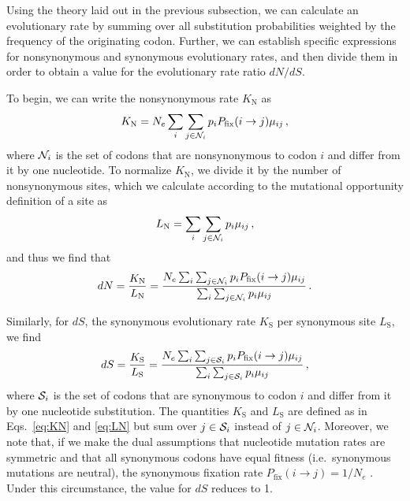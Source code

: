 \documentclass{pnastwo}
\begin{document}
\begin{article}
Using the theory laid out in the previous subsection, we can calculate an evolutionary rate by summing over all substitution probabilities weighted by the frequency of the originating codon. Further, we can establish specific expressions for nonsynonymous and synonymous evolutionary rates, and then divide them in order to obtain a value for the evolutionary rate ratio $dN/dS$.

To begin, we can write the nonsynonymous rate $K_\text{N}$ as 
\begin{equation}\label{eq:KN}
	K_\text{N} = N_e \sum_i \sum_{j \in {\cal N}_i} p_i P_\text{fix}(i \rightarrow j) \mu_{ij}\,,
\end{equation}
where ${\cal N}_i$ is the set of codons that are nonsynonymous to codon $i$ and differ from it by one nucleotide. To normalize $K_\text{N}$, we divide it by the number of nonsynonymous sites, which we calculate according to the mutational opportunity definition of a site \cite{GoldmanYang1994, Yang2006} as 
\begin{equation}\label{eq:LN}
	L_\text{N} = \sum_i \sum_{j \in {\cal N}_i} p_i \mu_{ij}\,, 
\end{equation} and thus we find that 
\begin{equation}\label{eq:dN}
	dN = \frac{K_\text{N}}{L_\text{N}}=\frac{N_e \sum_i \sum_{j \in {\cal N}_i} p_i P_\text{fix}(i \rightarrow j) \mu_{ij} } {\sum_i \sum_{j \in {\cal N}_i} p_i \mu_{ij}}\,.
\end{equation}
		
Similarly, for $dS$, the synonymous evolutionary rate $K_\text{S}$ per synonymous site $L_\text{S}$, we find
\begin{equation}\label{eq:dS}
	dS = \frac{K_\text{S}}{L_\text{S}}=\frac{ N_e \sum_i \sum_{j \in {\cal S}_i} p_i P_\text{fix}(i \rightarrow j) \mu_{ij} } {\sum_i \sum_{j \in {\cal S}_i} p_i \mu_{ij} }\,,
\end{equation}
where ${\cal S}_i$ is the set of codons that are synonymous to codon $i$ and differ from it by one nucleotide substitution. The quantities $K_\text{S}$ and $L_\text{S}$ are defined as in Eqs.~\eqref{eq:KN} and \eqref{eq:LN} but sum over $j\in {\cal S}_i$ instead of $j\in {\cal N}_i$. Moreover, we note that, if we make the dual assumptions that nucleotide mutation rates are symmetric and that all synonymous codons have equal fitness (i.e.\ synonymous mutations are neutral), the synonymous fixation rate $P_\text{fix}(i \rightarrow j)= 1/N_e$ \cite{CrowKimura1970}. Under this circumstance, the value for $dS$ reduces to 1.
		

\end{article}
\end{document}
